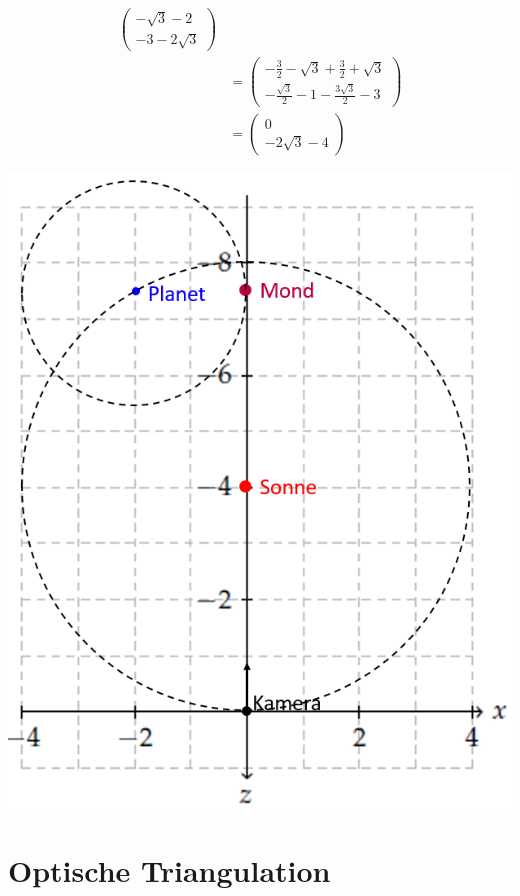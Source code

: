 \documentclass[a4paper,10pt,DIV=14]{scrartcl}
\begin{document}
\begin{align*}
\begin{pmatrix}
-\sqrt{3} - 2 \\ -3 - 2\sqrt{3}
\end{pmatrix} \\
&=
\begin{pmatrix}
-\frac{3}{2} - \sqrt{3} + \frac{3}{2} + \sqrt{3}\\
-\frac{\sqrt{3}}{2} - 1 - \frac{3\sqrt{3}}{2} - 3
\end{pmatrix} \\
&=
\begin{pmatrix}
0 \\ -2\sqrt{3} - 4
\end{pmatrix} 
\end{align*}

\includegraphics[width=.95\linewidth]{skizze.png}

\section{Optische Triangulation}
\end{document}
